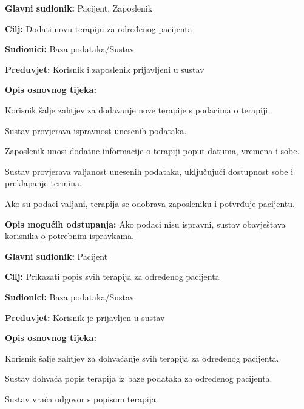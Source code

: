 \noindent {}
\begin{packed_item}
	\item \textbf{Glavni sudionik:} Pacijent, Zaposlenik
	\item \textbf{Cilj:} Dodati novu terapiju za određenog pacijenta
	\item \textbf{Sudionici:} Baza podataka/Sustav
	\item \textbf{Preduvjet:} Korisnik i zaposlenik prijavljeni u sustav
	\item \textbf{Opis osnovnog tijeka:}
	
	\begin{packed_enum}
		\item Korisnik šalje zahtjev za dodavanje nove terapije s podacima o terapiji.
		\item Sustav provjerava ispravnost unesenih podataka.
		\item Zaposlenik unosi dodatne informacije o terapiji poput datuma, vremena i sobe.
		\item Sustav provjerava valjanost unesenih podataka, uključujući dostupnost sobe i preklapanje termina.
		\item Ako su podaci valjani, terapija se odobrava zaposleniku i potvrđuje pacijentu.
	\end{packed_enum}
	
	\item \textbf{Opis mogućih odstupanja:} Ako podaci nisu ispravni, sustav obavještava korisnika o potrebnim ispravkama.
	
\end{packed_item}

\noindent {}
\begin{packed_item}
	
	\item \textbf{Glavni sudionik: }Pacijent
	\item  \textbf{Cilj:} Prikazati popis svih terapija za određenog pacijenta
	\item  \textbf{Sudionici:} Baza podataka/Sustav
	\item  \textbf{Preduvjet:} Korisnik je prijavljen u sustav
	\item  \textbf{Opis osnovnog tijeka:}
	
	\item[] \begin{packed_enum}
		
		\item Korisnik šalje zahtjev za dohvaćanje svih terapija za određenog pacijenta.
		\item Sustav dohvaća popis terapija iz baze podataka za određenog pacijenta.
		\item Sustav vraća odgovor s popisom terapija.
		
	\end{packed_enum}
	
	
\end{packed_item}

